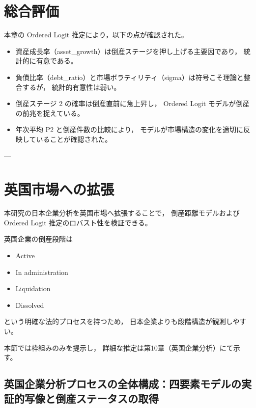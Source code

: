 \section{総合評価}

本章の Ordered Logit 推定により，以下の点が確認された。

\begin{itemize}
    \item 資産成長率（asset\_growth）は倒産ステージを押し上げる主要因であり，
          統計的に有意である。
    \item 負債比率（debt\_ratio）と市場ボラティリティ（sigma）は符号こそ理論と整合するが，
          統計的有意性は弱い。
    \item 倒産ステージ 2 の確率は倒産直前に急上昇し，
          Ordered Logit モデルが倒産の前兆を捉えている。
    \item 年次平均 P2 と倒産件数の比較により，
          モデルが市場構造の変化を適切に反映していることが確認された。
\end{itemize}

---

\section{英国市場への拡張}

本研究の日本企業分析を英国市場へ拡張することで，
倒産距離モデルおよび Ordered Logit 推定のロバスト性を検証できる。

英国企業の倒産段階は

\begin{itemize}
\item Active
\item In administration
\item Liquidation
\item Dissolved
\end{itemize}

という明確な法的プロセスを持つため，
日本企業よりも段階構造が観測しやすい。

本節では枠組みのみを提示し，
詳細な推定は第10章（英国企業分析）にて示す。


\subsection{英国企業分析プロセスの全体構成：四要素モデルの実証的写像と倒産ステータスの取得}
\label{sec:uk_analysis_full_process}

